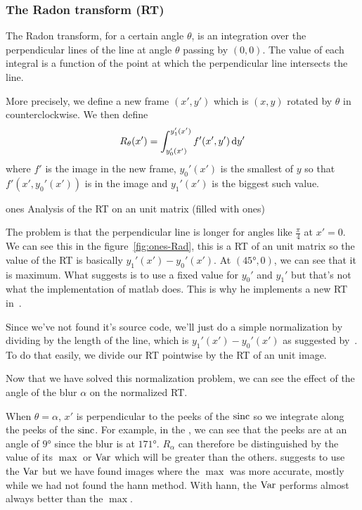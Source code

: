 \subsubsection{The Radon transform (RT)}
\label{sec:rt}
The Radon transform, for a certain angle $\theta$,
is an integration over the perpendicular lines of the line at
angle $\theta$ passing by $(0,0)$.
The value of each integral is a function of the
point at which the perpendicular line intersects the
line.

More precisely, we define a new frame $(x',y')$
which is $(x,y)$ rotated by $\theta$ in counterclockwise.
We then define
\[ R_\theta(x') = \int_{y_0'(x')}^{y_1'(x')} f'(x',y') \operatorname{d}\! y' \]
where $f'$ is the image in the new frame,
$y_0'(x')$ is the smallest of $y$ so that $f'(x',y_0'(x'))$ is in the image
and $y_1'(x')$ is the biggest such value.

\begin{myfig}{ones}
  {Analysis of the RT on an unit matrix (filled with ones)}
\end{myfig}

The problem is that the perpendicular line is longer for angles
like $\frac{\pi}{4}$ at $x' = 0$.
We can see this in the figure~\ref{fig:ones-Rad},
this is a RT of an unit matrix so the value of the RT is
basically $y_1'(x') - y_0'(x')$.
At $(\ang{45},0)$, we can see that it is maximum.
What \cite{oliveira2007blind} suggests is to use a fixed
value for $y_0'$ and $y_1'$ but that's not
what the implementation of matlab does.
This is why he implements a new RT in~\cite{oliveira2006implementation}.

Since we've not found it's source code,
we'll just do a simple normalization
by dividing by the length of the line,
which is $y_1'(x') - y_0'(x')$ as
suggested by~\cite{krahmer2006blind}.
To do that easily,
we divide our RT pointwise by the
RT of an unit image.

Now that we have solved this normalization problem,
we can see the effect of the angle of the blur $\alpha$
on the normalized RT.

When $\theta = \alpha$,
$x'$ is perpendicular to the peeks of the $\operatorname{sinc}$ so
we integrate along the peeks of the $\operatorname{sinc}$.
For example, in the , we can see
that the peeks are at an angle of $\ang{9}$ since the
blur is at $\ang{171}$.
$R_\alpha$ can therefore be distinguished by the value
of its $\max$ or $\operatorname{Var}$ which will be greater than the
others.
\cite{oliveira2007blind} suggests to use the $\operatorname{Var}$
but we have found images where the $\max$ was more
accurate, mostly while we had not found the hann method.
With hann, the $\operatorname{Var}$ performs almost always
better than the $\max$.

